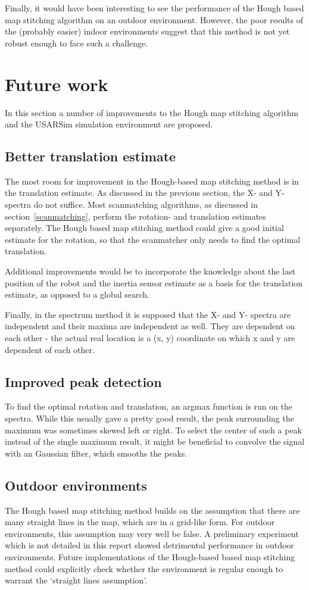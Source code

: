 Finally, it would have been interesting to see the performance of the Hough based map stitching algorithm on an outdoor environment. However, the poor results of the (probably easier) indoor environments suggest that this method is not yet robust enough to face such a challenge.

\section{Future work}
\label{futurework}
In this section a number of improvements to the Hough map stitching algorithm and the USARSim simulation environment are proposed. 

\subsection{Better translation estimate}
The most room for improvement in the Hough-based map stitching method is in the translation estimate. As discussed in the previous section, the X- and Y-spectra do not suffice. Most scanmatching algorithms, as discussed in section~\ref{scanmatching}, perform the rotation- and translation estimates separately. The Hough based map stitching method could give a good initial estimate for the rotation, so that the scanmatcher only needs to find the optimal translation. 

Additional improvements would be to incorporate the knowledge about the last position of the robot and the inertia sensor estimate as a basis for the translation estimate, as opposed to a global search. 

Finally, in the spectrum method it is supposed that the X- and Y- spectra are independent and their maxima are independent as well. They are dependent on each other - the actual real location is a (x, y) coordinate on which x and y are dependent of each other.

\subsection{Improved peak detection}
To find the optimal rotation and translation, an argmax function is run on the spectra. While this usually gave a pretty good result, the peak surrounding the maximum was sometimes skewed left or right. To select the center of such a peak instead of the single maximum result, it might be beneficial to convolve the signal with an Gaussian filter, which smooths the peaks.

\subsection{Outdoor environments}
The Hough based map stitching method builds on the assumption that there are many straight lines in the map, which are in a grid-like form. For outdoor environments, this assumption may very well be false. A preliminary experiment which is not detailed in this report showed detrimental performance in outdoor environments. Future implementations of the Hough-based based map stitching method could explicitly check whether the environment is regular enough to warrant the `straight lines assumption'.

